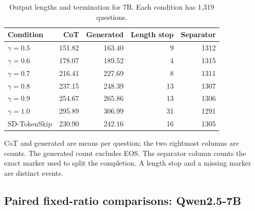 \begin{table}[H]\centering\small

\caption{Output lengths and termination for 7B. Each condition has 1,319 questions.}

\begin{tabular}{lrrrr}

\toprule

Condition & CoT & Generated & Length stop & Separator\\

\midrule

$\gamma=0.5$ & 151.82 & 163.40 & 9 & 1312\\

$\gamma=0.6$ & 178.07 & 189.52 & 4 & 1315\\

$\gamma=0.7$ & 216.41 & 227.69 & 8 & 1311\\

$\gamma=0.8$ & 237.15 & 248.39 & 13 & 1307\\

$\gamma=0.9$ & 254.67 & 265.86 & 13 & 1306\\

$\gamma=1.0$ & 295.89 & 306.99 & 31 & 1291\\

SD-TokenSkip & 230.90 & 242.16 & 16 & 1305\\

\bottomrule\end{tabular}\end{table}

CoT and generated are means per question; the two rightmost columns are counts. The generated count excludes EOS. The separator column counts the exact marker used to split the completion. A length stop and a missing marker are distinct events.

\subsection{Paired fixed-ratio comparisons: Qwen2.5-7B}

